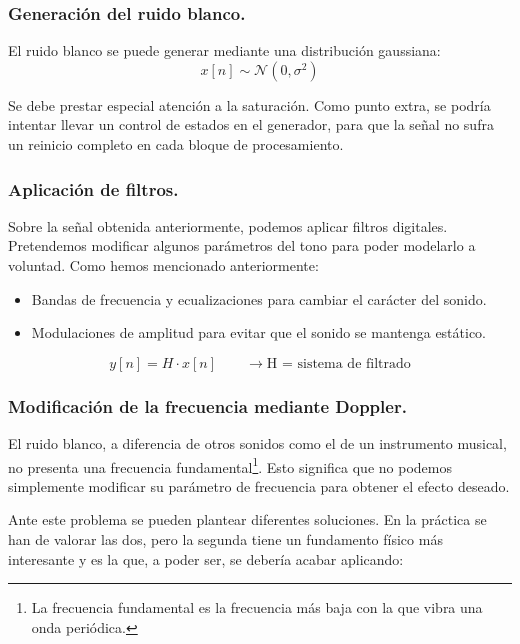 \documentclass[10.5pt]{article}
\begin{document}
	\subsubsection{Generación del ruido blanco.}
	
	El ruido blanco se puede generar mediante una distribución gaussiana:
	\begin{equation*}
		x[n] \sim \mathcal{N}(0, \sigma ^2)
	\end{equation*}
	
	Se debe prestar especial atención a la saturación. Como punto extra, se podría intentar llevar un control de estados en el generador, para que la señal no sufra un reinicio completo en cada bloque de procesamiento.
	
	\subsubsection{Aplicación de filtros.}
	
	Sobre la señal obtenida anteriormente, podemos aplicar filtros digitales. Pretendemos modificar algunos parámetros del tono para poder modelarlo a voluntad. Como hemos mencionado anteriormente:
	
	\begin{itemize}
		\item Bandas de frecuencia y ecualizaciones para cambiar el carácter del sonido.
		\item Modulaciones de amplitud para evitar que el sonido se mantenga estático.
	\end{itemize}
	
	\begin{equation*}
		y[n] = H \cdot { x[n]} \qquad \rightarrow \text{H = sistema de filtrado}
	\end{equation*}
	
	\subsubsection{Modificación de la frecuencia mediante Doppler.}
	
	El ruido blanco, a diferencia de otros sonidos como el de un instrumento musical, no presenta una frecuencia fundamental\footnote{La frecuencia fundamental es la frecuencia más baja con la que vibra una onda periódica.}. Esto significa que no podemos simplemente modificar su parámetro de frecuencia para obtener el efecto deseado. 
	
	Ante este problema se pueden plantear diferentes soluciones. En la práctica se han de valorar las dos, pero la segunda tiene un fundamento físico más interesante y es la que, a poder ser, se debería acabar aplicando:
	
\end{document}
